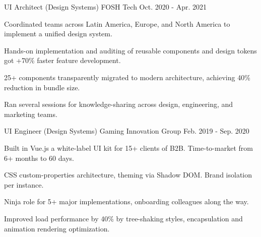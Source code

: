 \begin{cventries}
  \cventry
    {UI Architect (Design Systems)} %
    {FOSH Tech} %
    {} %
    {Oct. 2020 - Apr. 2021} %
    {
      \begin{cvitems} %
        \item {Coordinated teams across Latin America, Europe, and North America to implement a unified design system.}
        \item {Hands-on implementation and auditing of reusable components and design tokens got +70\% faster feature development.}
        \item {25+ components transparently migrated to modern architecture, achieving 40\% reduction in bundle size.}
        \item {Ran several sessions for knowledge-sharing across design, engineering, and marketing teams.}
      \end{cvitems}
    }

  \cventry
    {UI Engineer (Design Systems)} %
    {Gaming Innovation Group} %
    {} %
    {Feb. 2019 - Sep. 2020} %
    {
      \begin{cvitems} %
        \item {Built in Vue.js a white-label UI kit for 15+ clients of B2B. Time-to-market from 6+ months to 60 days.}
        \item {CSS custom-properties architecture, theming via Shadow DOM. Brand isolation per instance.}
        \item {Ninja role for 5+ major implementations, onboarding colleagues along the way.}
        \item {Improved load performance by 40\% by tree-shaking styles, encapsulation and animation rendering optimization.}
      \end{cvitems}
    }



\end{cventries}
